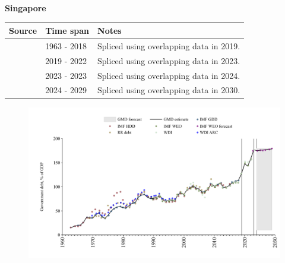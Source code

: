 \documentclass[12pt,a4paper,landscape]{article}
\begin{document}
\begin{adjustbox}{max totalsize={\paperwidth}{\paperheight},center}
\begin{minipage}[t][\textheight][t]{\textwidth}
\vspace*{0.5cm}
{}
\begin{center}
{\Large\bfseries Singapore}
\end{center}
\vspace{0.5cm}
\begin{table}[H]
\centering
\small
\begin{tabular}{|l|l|l|}
\hline
\textbf{Source} & \textbf{Time span} & \textbf{Notes} \\
\hline
\rowcolor{white}\cite{IMF_GDD}& 1963 - 2018 &Spliced using overlapping data in 2019.\\
\rowcolor{lightgray}\cite{IMF_WEO}& 2019 - 2022 &Spliced using overlapping data in 2023.\\
\rowcolor{white}\cite{WDI}& 2023 - 2023 &Spliced using overlapping data in 2024.\\
\rowcolor{lightgray}\cite{IMF_WEO_forecast}& 2024 - 2029 &Spliced using overlapping data in 2030.\\
\hline
\end{tabular}
\end{table}
\begin{figure}[H]
\centering
\includegraphics[width=\textwidth,height=0.6\textheight,keepaspectratio]{graphs/SGP_govdebt_GDP.pdf}
\end{figure}
\end{minipage}
\end{adjustbox}
\end{document}
